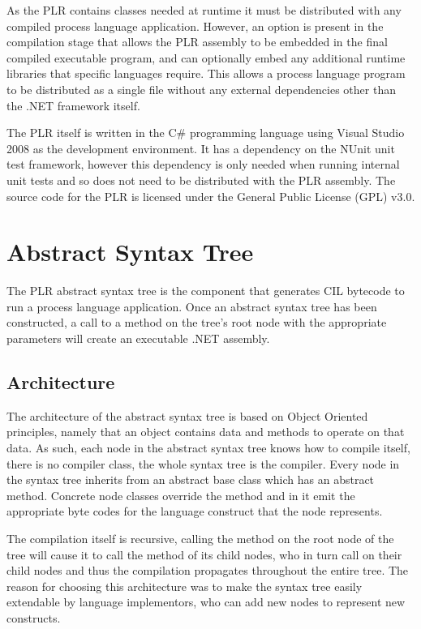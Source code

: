 	As the PLR contains classes needed at runtime it must be distributed with 
	any compiled process language application. However, an option is present in 
	the compilation stage that allows the PLR assembly to be embedded in the 
	final compiled executable program, and can optionally embed any additional 
	runtime libraries that specific languages require. This allows a process 
	language program to be distributed as a single file without any external 
	dependencies other than the .NET framework itself.

	The PLR itself is written in the C\# programming language using Visual 
	Studio 2008 as the development environment. It has a dependency on the NUnit 
	unit test framework, however this dependency is only needed when running 
	internal unit tests and so does not need to be distributed with the PLR 
	assembly. The source code for the PLR is licensed under the General Public 
	License (GPL) v3.0.
	
\section{Abstract Syntax Tree}

	The PLR abstract syntax tree is the component that generates CIL 
	bytecode to run a process language application. Once an abstract syntax tree 
	has been constructed, a call to a  method on the tree's root 
	node with the appropriate parameters will create an executable .NET 
	assembly. 

\subsection{Architecture}

	The architecture of the abstract syntax tree is based on Object Oriented 
	principles, namely that an object contains data and methods to operate on 
	that data. As such, each node in the abstract syntax tree knows how to 
	compile itself, there is no compiler class, the whole syntax tree is the 
	compiler. Every node in the syntax tree inherits from an abstract 
	 base class which has an abstract  
	method. Concrete node classes override the  method and in it 
	emit the appropriate byte codes for the language construct that the node 
	represents. 
	
	The compilation itself is recursive, calling the  method 
	on the root node of the tree will cause it to call the  
	method of its child nodes, who in turn call  on their child 
	nodes and thus the compilation propagates throughout the entire tree. The 
	reason for choosing this architecture was to make the syntax tree easily 
	extendable by language implementors, who can add new nodes to represent new 
	constructs. 
	
